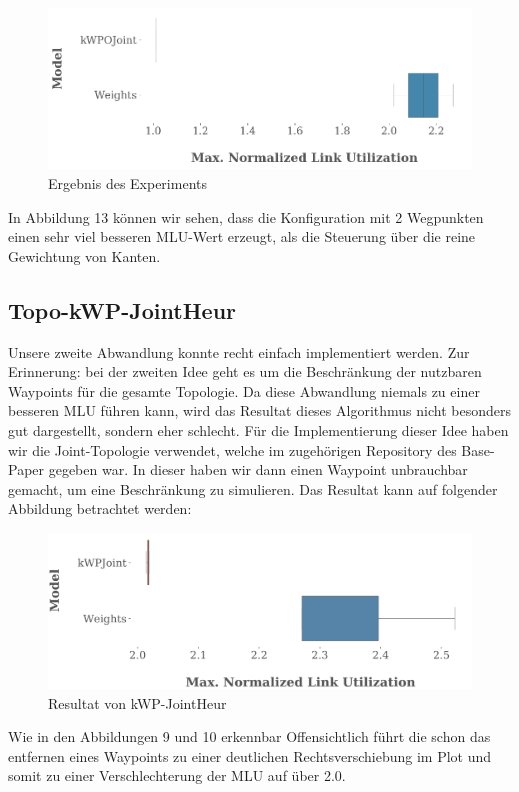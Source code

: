 \documentclass[sigconf,noacm,review]{acmart}
\begin{document}
\begin{figure}[h]
  \centering
  \includegraphics[width=\linewidth]{abbildungen/kWPOJoint_Plot.png}
  \caption{Ergebnis des Experiments}
\end{figure}
In Abbildung 13 können wir sehen, dass die Konfiguration mit 2 Wegpunkten einen sehr viel besseren MLU-Wert erzeugt, als die Steuerung über die reine Gewichtung von Kanten.

\subsection{Topo-kWP-JointHeur}
Unsere zweite Abwandlung konnte recht einfach implementiert werden. Zur Erinnerung: bei der zweiten Idee geht es um die Beschränkung der nutzbaren Waypoints für die gesamte Topologie. Da diese Abwandlung niemals zu einer besseren MLU führen kann, wird das Resultat dieses Algorithmus nicht besonders gut dargestellt, sondern eher schlecht.
Für die Implementierung dieser Idee haben wir die Joint-Topologie verwendet, welche im zugehörigen Repository des Base-Paper gegeben war. In dieser haben wir dann einen Waypoint unbrauchbar gemacht, um eine Beschränkung zu simulieren. Das Resultat kann auf folgender Abbildung betrachtet werden:

\begin{figure}[h]
  \centering
  \includegraphics[width=\linewidth]{abbildungen/22}
  \caption{Resultat von kWP-JointHeur}
\end{figure}
Wie in den Abbildungen 9 und 10 erkennbar
Offensichtlich führt die schon das entfernen eines Waypoints zu einer deutlichen Rechtsverschiebung im Plot und somit zu einer Verschlechterung der MLU auf über 2.0.
\end{document}

